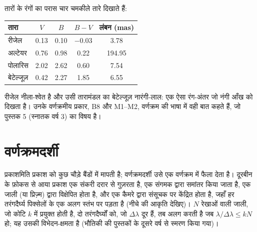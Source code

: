 तारों के रंगों का परास चार चमकीले तारे दिखाते हैं:
\begin{center}
\small
\begin{tabular}{lcccc}
\hline
तारा & $V$ & $B$ & $B - V$ & लंबन (\unit{mas}) \\
\hline
रीजेल & 0.13 & 0.10 & $-0.03$ & 3.78 \\
अल्टेयर & 0.76 & 0.98 & 0.22 & 194.95 \\
पोलारिस & 2.02 & 2.62 & 0.60 & 7.54 \\
बेटेल्जूज़ & 0.42 & 2.27 & 1.85 & 6.55 \\
\hline
\end{tabular}
\end{center}
रीजेल नीला-श्वेत है और उसी तारामंडल का बेटेल्जूज़ नारंगी-लाल: एक ऐसा रंग-अंतर जो नंगी आँख को दिखता
है। उनके वर्णक्रमीय प्रकार, B8 और M1--M2, वर्णक्रम की भाषा में वही बात कहते हैं, जो पुस्तक 5
(स्नातक वर्ष 3) का विषय है।

\section{वर्णक्रमदर्शी}

प्रकाशमिति प्रकाश को कुछ चौड़े बैंडों में मापती है; वर्णक्रमदर्शी उसे एक वर्णक्रम में फैला देता है।
दूरबीन के फ़ोकस से आया प्रकाश एक संकरी दरार से गुज़रता है, एक संगमक द्वारा समांतर किया जाता है,
एक जाली (या प्रिज़्म) द्वारा विक्षेपित होता है, और एक कैमरे द्वारा संसूचक पर केंद्रित होता है, जहाँ
हर तरंगदैर्घ्य पिक्सेलों के एक अलग स्तंभ पर पड़ता है (नीचे की आकृति देखिए)। $N$ रेखाओं वाली जाली,
जो कोटि $k$ में प्रयुक्त होती है, दो तरंगदैर्घ्यों को, जो $\Delta\lambda$ दूर हैं, तब अलग करती है जब
$\lambda/\Delta\lambda \le kN$ हो; यह उसकी विभेदन-क्षमता है (भौतिकी की पुस्तकों के दूसरे वर्ष से स्मरण किया गया)।

